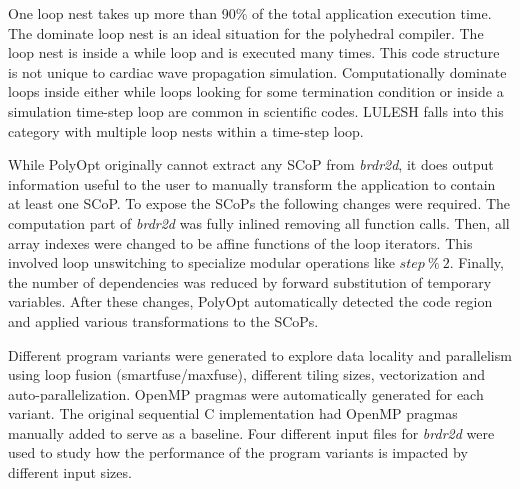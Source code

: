 One loop nest takes up more than 90\% of the total application execution time. 
The dominate loop nest is an ideal situation for the polyhedral compiler. 
The loop nest is inside a while loop and is executed many times. 
This code structure is not unique to cardiac wave propagation simulation. 
Computationally dominate loops inside either while loops looking for 
some termination condition or inside a simulation time-step loop
are common in scientific codes. LULESH falls into this category
with multiple loop nests within a time-step loop.

While PolyOpt originally cannot extract any SCoP from \emph{brdr2d}, it does output
information useful to the user to manually transform the application to contain at least one SCoP.
To expose the SCoPs the following changes were required. The computation part 
of \emph{brdr2d} was fully inlined removing all function calls.
Then, all array indexes were changed to be affine functions of the 
loop iterators. This involved loop unswitching to specialize modular operations
like $step~\%~2$. Finally, the number of dependencies was reduced by forward substitution
of temporary variables. After these changes, PolyOpt automatically detected the code
region and applied various transformations to the SCoPs. 


Different program variants were generated to explore data locality and parallelism
using loop fusion (smartfuse/maxfuse), different tiling sizes, vectorization and auto-parallelization. 
OpenMP pragmas were automatically generated for each variant.
The original sequential C implementation had OpenMP pragmas manually added to serve as
a baseline.
Four different input files for \emph{brdr2d} were used to study how the
performance of the program variants is impacted by different
input sizes. 
 
